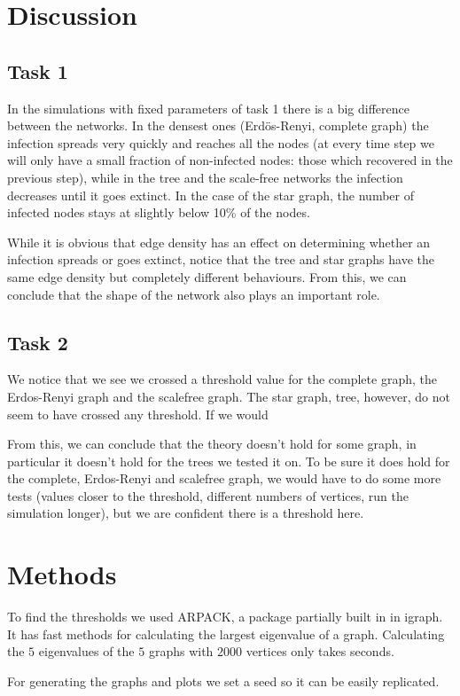 \documentclass[paper=a4, fontsize=11pt]{scrartcl} %
\begin{document}
\section{Discussion}
\subsection{Task 1}
In the simulations with fixed parameters of task 1 there is a big difference between the networks. In the densest ones (Erdös-Renyi, complete graph) the infection spreads very quickly and reaches all the nodes (at every time step we will only have a small fraction of non-infected nodes: those which recovered in the previous step), while in the tree and the scale-free networks the infection decreases until it goes extinct. In the case of the star graph, the number of infected nodes stays at slightly below 10\% of the nodes.

While it is obvious that edge density has an effect on determining whether an infection spreads or goes extinct, notice that the tree and star graphs have the same edge density but completely different behaviours. From this, we can conclude that the shape of the network also plays an important role.

\subsection{Task 2}
We notice that we see we crossed a threshold value for the complete graph, the Erdos-Renyi graph and the scalefree graph. The star graph, tree, however, do not seem to have crossed any threshold. If we would 

From this, we can conclude that the theory doesn't hold for some graph, in particular it doesn't hold for the trees we tested it on. To be sure it does hold for the complete, Erdos-Renyi and scalefree graph, we would have to do some more tests (values closer to the threshold, different numbers of vertices, run the simulation longer), but we are confident there is a threshold here.

\section{Methods}
To find the thresholds we used ARPACK, a package partially built in in igraph. It has fast methods for calculating the largest eigenvalue of a graph. Calculating the $5$ eigenvalues of the $5$ graphs with $2000$ vertices only takes seconds.

For generating the graphs and plots we set a seed so it can be easily replicated.
\end{document}
